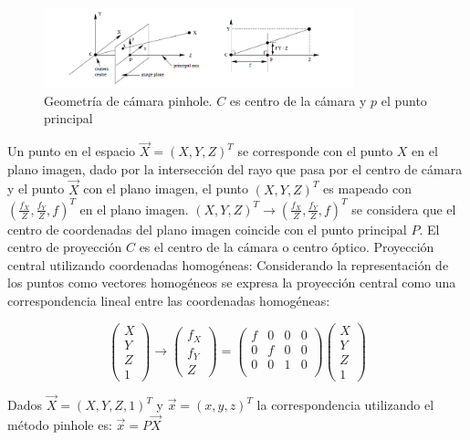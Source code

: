 \begin{figure}[H]
  \centering
    \includegraphics[width=0.8\textwidth]{./Cap6_reconstruccion/pinhole.png}
  \caption{Geometría de cámara pinhole. $C$ es centro de la cámara y $p$ el punto principal}
  \label{fig:Calib-Pinhole}
\end{figure}

Un punto en el espacio $ \vec{X}=(X,Y,Z)^T$ se corresponde con el punto $X$ en el plano imagen, dado por la intersección del rayo que pasa por el centro de cámara y el punto $\vec{X}$ con el plano imagen, el punto $(X,Y,Z)^T$ es mapeado con $(\frac{f_X}{Z}, \frac{f_Y}{Z}, f)^T$ en el plano imagen.
$(X, Y, Z)^T \to (\frac{f_X}{Z}, \frac{f_Y}{Z},f)^T$ se considera que el centro de coordenadas del plano imagen coincide con el punto principal $P$.
El centro de proyección $C$ es el centro de la cámara o centro óptico.
Proyección central utilizando coordenadas homogéneas:
Considerando la representación de los puntos como vectores homogéneos se expresa la proyección central como una correspondencia lineal entre las coordenadas homogéneas:

\[
\begin{pmatrix}
X \\ Y \\ Z \\ 1
\end{pmatrix}
\to
\begin{pmatrix}
f_X \\ f_Y \\ Z
\end{pmatrix}
=
\begin{pmatrix}
f & 0 & 0 & 0 \\
0 & f & 0 & 0 \\
0 & 0 & 1 & 0 \\
\end{pmatrix}
\begin{pmatrix}
X \\ Y \\ Z \\ 1
\end{pmatrix}
\]

Dados $\vec{X} = (X,Y,Z,1)^T$ y $\vec{x} =(x,y,z)^T$ la correspondencia utilizando el método pinhole es:
$\vec{x}=P\vec{X}$

